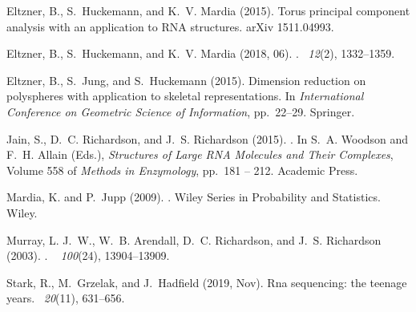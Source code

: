 \documentclass{llncs}
\begin{document}
\begin{thebibliography}{}
  Eltzner, B., S.~Huckemann, and K.~V. Mardia (2015).
  \newblock Torus principal component analysis with an application to {RNA}
  structures.
  \newblock arXiv 1511.04993.
  
  Eltzner, B., S.~Huckemann, and K.~V. Mardia (2018, 06).
  .
  ~{\em 12\/}(2), 1332--1359.
  
  Eltzner, B., S.~Jung, and S.~Huckemann (2015).
  \newblock Dimension reduction on polyspheres with application to skeletal
  representations.
  \newblock In {\em International Conference on Geometric Science of
    Information}, pp.\  22--29. Springer.
  
  Jain, S., D.~C. Richardson, and J.~S. Richardson (2015).
  .
  \newblock In S.~A. Woodson and F.~H. Allain (Eds.), {\em Structures of Large
    RNA Molecules and Their Complexes}, Volume 558 of {\em Methods in
    Enzymology}, pp.\  181 -- 212. Academic Press.
  
  Mardia, K. and P.~Jupp (2009).
  .
  \newblock Wiley Series in Probability and Statistics. Wiley.
  
  Murray, L. J.~W., W.~B. Arendall, D.~C. Richardson, and J.~S. Richardson
  (2003).
  .
  ~{\em
    100\/}(24), 13904--13909.
  
  Stark, R., M.~Grzelak, and J.~Hadfield (2019, Nov).
  \newblock Rna sequencing: the teenage years.
  ~{\em 20\/}(11), 631--656.
  

\end{thebibliography}
\end{document}
